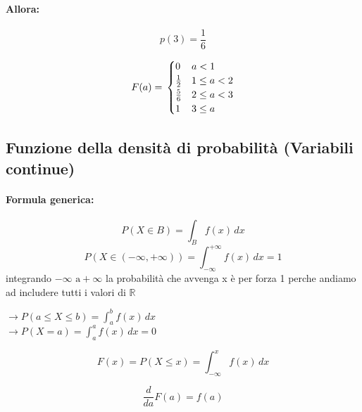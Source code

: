 \documentclass[]{article}
\newcommand{\formula}{\paragraph{Formula generica:}}
\begin{document}
    \paragraph{Allora:}
    \[ p(3) = \frac{1}{6}\]

    \begin{equation*}
        F(a) = \\
        \begin{cases}
            0 & a < 1 \\
            \frac{1}{2} & 1 \leq a < 2 \\
            \frac{5}{6} & 2 \leq a < 3 \\
            1 & 3 \leq a
        \end{cases}
    \end{equation*}

    \subsection{Funzione della densità di probabilità (Variabili continue)}
    \formula
    \[ P(X \in B) = \int_{B}^{} f(x) \,dx \]
    \[ P(X \in (-\infty, +\infty)) = \int_{-\infty}^{+\infty} f(x) \,dx=1 \]
    integrando $-\infty \text{ a} +\infty$ la probabilità che avvenga x è per forza 1 perche andiamo ad includere tutti i valori di $\mathbb{R}$

    \begin{center}
         $\longrightarrow P(a \leq X \leq b) = \int_{a}^{b} f(x) \, dx $
        \\
         $\longrightarrow P(X = a) = \int_{a}^{a} f(x) \, dx = 0 $
    \end{center}
   

    \[ F(x) = P(X \leq x) = \int_{-\infty}^{x} f(x )\, dx \]

    \[ \frac{d}{da} F(a) = f(a)  \]
\end{document}
